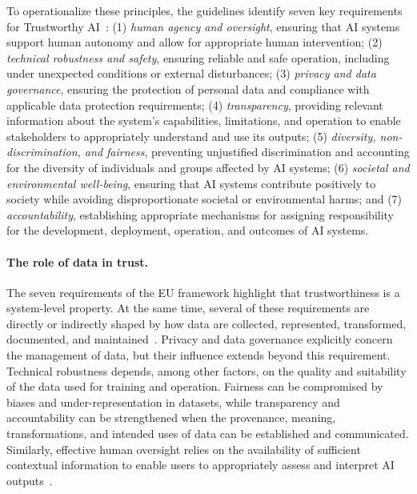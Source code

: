 To operationalize these principles, the guidelines identify seven key requirements for Trustworthy AI~\cite{european_commission_ethics_nodate,kaur_trustworthy_2022}: (1) \emph{human agency and oversight}, ensuring that AI systems support human autonomy and allow for appropriate human intervention; (2) \emph{technical robustness and safety}, ensuring reliable and safe operation, including under unexpected conditions or external disturbances; (3) \emph{privacy and data governance}, ensuring the protection of personal data and compliance with applicable data protection requirements; (4) \emph{transparency}, providing relevant information about the system's capabilities, limitations, and operation to enable stakeholders to appropriately understand and use its outputs; (5) \emph{diversity, non-discrimination, and fairness}, preventing unjustified discrimination and accounting for the diversity of individuals and groups affected by AI systems; (6) \emph{societal and environmental well-being}, ensuring that AI systems contribute positively to society while avoiding disproportionate societal or environmental harms; and (7) \emph{accountability}, establishing appropriate mechanisms for assigning responsibility for the development, deployment, operation, and outcomes of AI systems.

\paragraph{The role of data in trust.}
The seven requirements of the EU framework highlight that trustworthiness is a system-level property. At the same time, several of these requirements are directly or indirectly shaped by how data are collected, represented, transformed, documented, and maintained~\cite{kaur_trustworthy_2022}. Privacy and data governance explicitly concern the management of data, but their influence extends beyond this requirement. Technical robustness depends, among other factors, on the quality and suitability of the data used for training and operation. Fairness can be compromised by biases and under-representation in datasets, while transparency and accountability can be strengthened when the provenance, meaning, transformations, and intended uses of data can be established and communicated. Similarly, effective human oversight relies on the availability of sufficient contextual information to enable users to appropriately assess and interpret AI outputs~\cite{guidotti_survey_2019}.

